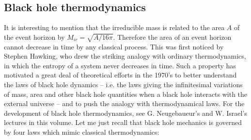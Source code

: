 \documentclass[12pt]{article}
\begin{document}
\subsection {Black hole thermodynamics}
\label{sec:luminet:BHTD}

It is interesting to mention that the
irreducible mass is related to the area $A$ of the event horizon by 
$M_{ir} = \sqrt{A/16\pi}$.
Therefore the area of an event horizon cannot decrease
in time by any classical process. This was first noticed by Stephen
Hawking, who drew the striking analogy with ordinary thermodynamics, in which
the entropy of a system never decreases in time. Such a property has motivated a great deal
of theoretical efforts in the
1970's to better understand the laws of black hole dynamics -- i.e. the laws
giving the infinitesimal variations of mass, area and other black hole 
quantities when a black
hole interacts with the external universe -- and to push the analogy with thermodynamical
laws. For the development of black hole thermodynamics, see G. Neugebaueur's and W.
Israel's lectures in this volume. Let me just recall that black hole mechanics is
governed by four laws which mimic classical thermodynamics:
\end{document}
